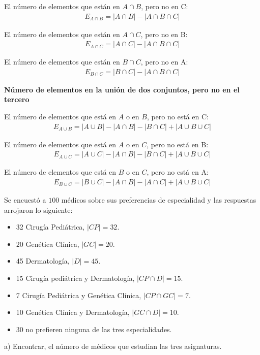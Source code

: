 \noindent El número de elementos que están en $A\cap B$, pero no en C:\\
\begin{eqnarray}
E_{A\cap B}=|A\cap B|-|A\cap B\cap C|
\end{eqnarray}

\noindent El número de elementos que están en $A\cap C$, pero no en B:\\
\begin{eqnarray}
E_{A\cap C}=|A\cap C|-|A\cap B\cap C|
\end{eqnarray}

\noindent El número de elementos que están en $B\cap C$, pero no en A:\\
\begin{eqnarray}
E_{B\cap C}=|B\cap C|-|A\cap B\cap C|
\end{eqnarray}

\begin{center}
\textbf{Número de elementos en la unión de dos conjuntos, pero no en el tercero}\\
\end{center}

\noindent El número de elementos que está en $A$ o en $B$, pero no está en C:\\
\begin{eqnarray}
E_{A\cup B}=|A\cup B|-|A\cap B|-|B\cap C|+|A\cup B\cup C|
\end{eqnarray}

\noindent El número de elementos que está en $A$ o en $C$, pero no está en B:\\
\begin{eqnarray}
E_{A\cup C}=|A\cup C|-|A\cap B|-|B\cap C|+|A\cup B\cup C|
\end{eqnarray}

\noindent El número de elementos que está en $B$ o en $C$, pero no está en A:\\
\begin{eqnarray}
E_{B\cup C}=|B\cup C|-|A\cap B|-|A\cap C|+|A\cup B\cup C|
\end{eqnarray}

\begin{myexample}
Se encuestó a $100$ médicos sobre sus preferencias de especialidad y las respuestas arrojaron lo siguiente:
\end{myexample}
\begin{itemize}
	\item 32 Cirugía Pediátrica, $|CP|=32$.
	\item 20 Genética Clínica, $|GC|=20$.
	\item 45 Dermatología, $|D|=45$.
	\item 15 Cirugía pediátrica y Dermatología, $|CP\cap D|=15$.
	\item 7 Cirugía Pediátrica y Genética Clínica, $|CP\cap GC|=7$.
	\item 10 Genética Clínica y Dermatología, $|GC\cap D|=10$.
	\item 30 no prefieren ninguna de las tres especialidades.
\end{itemize}
\noindent a) Encontrar, el número de médicos que estudian las tres asignaturas.\\

